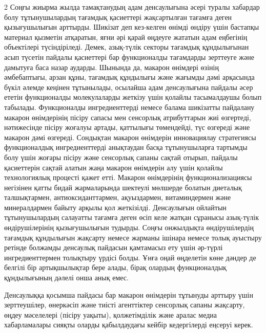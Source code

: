 \begin{multicols}{2}
Соңғы жиырма жылда тамақтанудың адам денсаулығына әсері туралы хабардар
болу тұтынушылардың тағамдық қасиеттері жақсартылған тағамға деген
қызығушылығын арттырды. Шикізат деп кез-келген өнімді өндіру үшін
бастапқы материал қызметін атқаратын, яғни әрі қарай өңдеуге жататын
адам еңбегінің объектілері түсіндіріледі. Демек, азық-түлік секторы
тағамдық құндылығынан асып түсетін пайдалы қасиеттері бар функционалды
тағамдарды зерттеуге және дамытуға баса назар аударды. Шынында да,
макарон өнімдері өзінің әмбебаптығы, арзан құны, тағамдық құндылығы және
жағымды дәмі арқасында бүкіл әлемде кеңінен тұтынылады, осылайша адам
денсаулығына пайдалы әсер ететін функционалды молекулаларды жеткізу үшін
қолайлы тасымалдаушы болып табылады. Функционалды ингредиенттерді немесе
балама шикізатты пайдалану макарон өнімдерінің пісіру сапасы мен
сенсорлық атрибуттарын жиі өзгертеді, нәтижесінде пісіру жоғалуы артады,
қаттылығы төмендейді, түс өзгереді және макарон дәмі өзгереді. Сондықтан
макарон өнімдерін инновациялау стратегиясы функционалдық ингредиенттерді
анықтаудан басқа тұтынушыларға тартымды болу үшін жоғары пісіру және
сенсорлық сапаны сақтай отырып, пайдалы қасиеттерін сақтай алатын жаңа
макарон өнімдерін алу үшін қолайлы технологиялық процесті қажет етті.
Макарон өнімдерінің функционализациясы негізінен қатты бидай
жармаларында шектеулі мөлшерде болатын диеталық талшықтармен,
антиоксиданттармен, ақуыздармен, витаминдермен және минералдармен байыту
арқылы қол жеткізілді\emph{.} Денсаулығын ойлайтын тұтынушылардың
салауатты тағамға деген өсіп келе жатқан сұранысы азық-түлік
өндірушілерінің қызығушылығын тудырды. Соңғы онжылдықта өндірушілердің
тағамдық құндылығын жақсарту немесе жарманы ішінара немесе толық
ауыстыру ретінде болжамды денсаулық пайдасын қамтамасыз ету үшін
әр-түрлі ингредиенттермен толықтыру үрдісі болды. Ұнға оңай өңделетін
көне дәндер де белгілі бір артықшылықтар бере алады, бірақ олардың
функционалдық құндылығының дәлелі онша анық емес.

Денсаулыққа қосымша пайдасы бар макарон өнімдерін тұтынуды арттыру үшін
зерттеушілер, өнеркәсіп және тиісті агенттіктер сенсорлық сапаны
жақсарту, өңдеу мәселелері (пісіру уақыты), қолжетімділік және аралас
медиа хабарламалары сияқты оларды қабылдаудағы кейбір кедергілерді
еңсеруі керек.


\end{multicols}
